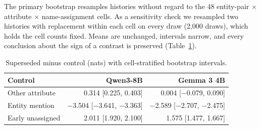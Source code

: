 The primary bootstrap resamples histories without regard to the 48 entity-pair $\times$ attribute $\times$ name-assignment cells. As a sensitivity check we resampled two histories with replacement within each cell on every draw (2,000 draws), which holds the cell counts fixed. Means are unchanged, intervals narrow, and every conclusion about the sign of a contrast is preserved (Table~\ref{tab:b-stratified}).

\begin{table}[h]
\caption{Superseded minus control (nats) with cell-stratified bootstrap intervals.}
\label{tab:b-stratified}
\begin{center}
\small
\begin{tabular}{@{}lrr@{}}
\toprule
Control & Qwen3-8B & Gemma 3 4B \\
\midrule
Other attribute & 0.314 [0.225, 0.403] & 0.004 [−0.079, 0.090] \\
Entity mention & −3.504 [−3.641, −3.363] & −2.589 [−2.707, −2.475] \\
Early unassigned & 2.011 [1.920, 2.100] & 1.575 [1.477, 1.667] \\
\bottomrule
\end{tabular}
\end{center}
\end{table}

\FloatBarrier
